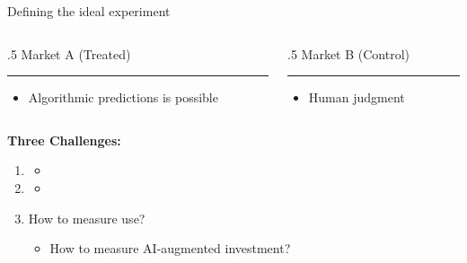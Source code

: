 \documentclass[aspectratio=169,t,11pt,table]{beamer}
\begin{document}
\begin{frame}{Defining the ideal experiment}
  \begin{columns}[T]
        \begin{column}{.5\textwidth}
            \centering
            \textcolor{accentblue}{Market A (Treated)} \\
            {\color{accentblue}\rule{\linewidth}{2pt}}
            \vspace{-4mm}
                \begin{itemize}
                    \item \textcolor{accentblue}{Algorithmic predictions is possible}
                \end{itemize}
        \end{column}        
        \hfill
        \begin{column}{.5\textwidth}
            \centering
            \textcolor{raspberry}{Market B (Control)} \\
            {\color{raspberry}\rule{\linewidth}{2pt}}
            \vspace{-4mm}
                \begin{itemize}
                    \item \textcolor{raspberry}{Human judgment}
                \end{itemize}
        \end{column}
    \end{columns}
    \vspace{8mm}

        \textbf{Three Challenges:}
        \vspace{1mm}
        \begin{enumerate} \footnotesize
            \item {}
                \begin{itemize} \footnotesize
                    \item {}
                \end{itemize}
                \vspace{1mm}
                \item {}
                \begin{itemize} \footnotesize
                    \item {}
                \end{itemize}
                \vspace{1mm}
                \item How to measure use?
                \begin{itemize} \footnotesize
                    \item How to measure AI-augmented investment?
                \end{itemize}
                \vspace{1mm}

        \end{enumerate}
\end{frame}
\end{document}

